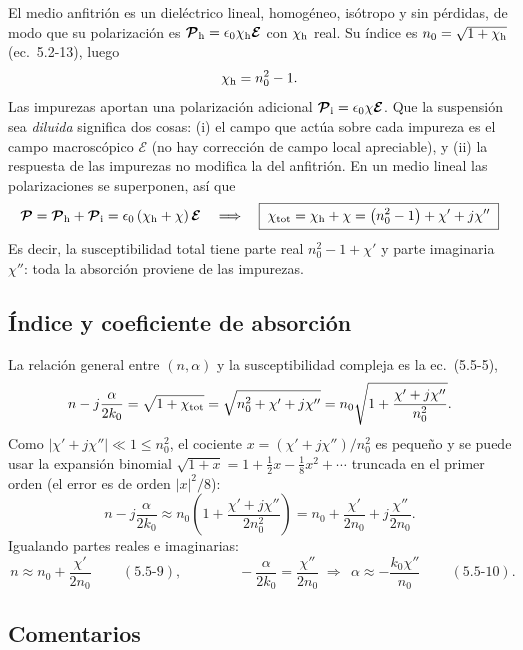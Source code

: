 \documentclass{article}
\newcommand{\Ec}{\boldsymbol{\mathcal{E}}}
\newcommand{\Pc}{\boldsymbol{\mathcal{P}}}
\begin{document}
El medio anfitrión es un dieléctrico lineal, homogéneo, isótropo y sin pérdidas, de modo que su
polarización es $\Pc_{\rm h}=\epsilon_0\chi_{\rm h}\Ec$ con $\chi_{\rm h}$ real. Su índice es
$n_0=\sqrt{1+\chi_{\rm h}}$ (ec.~5.2-13), luego
\[
\chi_{\rm h}=n_0^2-1 .
\]
Las impurezas aportan una polarización adicional $\Pc_{\rm i}=\epsilon_0\chi\Ec$. Que la
suspensión sea \emph{diluida} significa dos cosas: (i) el campo que actúa sobre cada impureza es
el campo macroscópico $\Ec$ (no hay corrección de campo local apreciable), y (ii) la respuesta
de las impurezas no modifica la del anfitrión. En un medio lineal las polarizaciones se
superponen, así que
\[
\Pc=\Pc_{\rm h}+\Pc_{\rm i}=\epsilon_0\left(\chi_{\rm h}+\chi\right)\Ec
\quad\Longrightarrow\quad
\boxed{\;\chi_{\rm tot}=\chi_{\rm h}+\chi=\left(n_0^2-1\right)+\chi'+j\chi''\;}
\]
Es decir, la susceptibilidad total tiene parte real $n_0^2-1+\chi'$ y parte imaginaria $\chi''$:
toda la absorción proviene de las impurezas.

\subsection*{Índice y coeficiente de absorción}

La relación general entre $(n,\alpha)$ y la susceptibilidad compleja es la ec.~(5.5-5),
\[
n-j\frac{\alpha}{2k_0}=\sqrt{1+\chi_{\rm tot}}
=\sqrt{n_0^2+\chi'+j\chi''}
= n_0\sqrt{1+\frac{\chi'+j\chi''}{n_0^2}} .
\]
Como $|\chi'+j\chi''|\ll1\le n_0^2$, el cociente $x=(\chi'+j\chi'')/n_0^2$ es pequeño y se puede
usar la expansión binomial $\sqrt{1+x}=1+\tfrac12x-\tfrac18x^2+\cdots$ truncada en el primer
orden (el error es de orden $|x|^2/8$):
\[
n-j\frac{\alpha}{2k_0}\approx n_0\left(1+\frac{\chi'+j\chi''}{2n_0^2}\right)
= n_0+\frac{\chi'}{2n_0}+j\frac{\chi''}{2n_0}.
\]
Igualando partes reales e imaginarias:
\[
\boxed{\,n\approx n_0+\frac{\chi'}{2n_0}\,}\qquad(5.5\text{-}9),
\qquad\qquad
-\frac{\alpha}{2k_0}=\frac{\chi''}{2n_0}\;\Longrightarrow\;
\boxed{\,\alpha\approx-\frac{k_0\chi''}{n_0}\,}\qquad(5.5\text{-}10).
\]

\subsection*{Comentarios}
\end{document}
